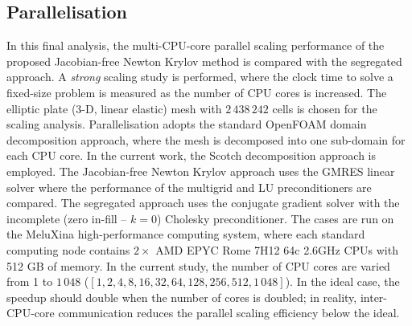 \documentclass[sn-mathphys,Numbered]{sn-jnl}%
\begin{document}



\subsection{Parallelisation}
\label{sec:parallelisation}
In this final analysis, the multi-CPU-core parallel scaling performance of the proposed Jacobian-free Newton Krylov method is compared with the segregated approach.
A \emph{strong} scaling study is performed, where the clock time to solve a fixed-size problem is measured as the number of CPU cores is increased.
The elliptic plate (3-D, linear elastic) mesh with $2\,438\,242$ cells is chosen for the scaling analysis.
Parallelisation adopts the standard OpenFOAM domain decomposition approach, where the mesh is decomposed into one sub-domain for each CPU core.
In the current work, the Scotch decomposition approach \citep{Pellegrini2012} is employed.
The Jacobian-free Newton Krylov approach uses the GMRES linear solver where the performance of the multigrid and LU preconditioners are compared.
The segregated approach uses the conjugate gradient solver with the incomplete (zero in-fill -- $k = 0$) Cholesky preconditioner.
The cases are run on the MeluXina high-performance computing system, where each standard computing node contains $2\times$ AMD EPYC Rome 7H12 64c 2.6GHz CPUs with 512 GB of memory.
In the current study, the number of CPU cores are varied from 1 to $1\,048$ ($\left[ 1, 2, 4, 8, 16, 32, 64, 128, 256, 512, 1\,048 \right]$).
In the ideal case, the speedup should double when the number of cores is doubled; in reality, inter-CPU-core communication reduces the parallel scaling efficiency below the ideal.
\end{document}
